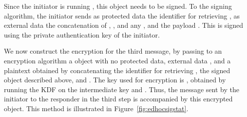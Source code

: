 {Since the initiator is running \mSig, this \mCose{} object needs to be signed. To the signing algorithm, the initiator sends as protected data the identifier for retrieving \mCredi, as external data the concatenation of \mTHthree, \mCredi, and any \mADthree, and the payload \mMacthree. This is signed using the private authentication key of the initiator.  

We now construct the encryption for the third message, by passing to an \mAead{}
encryption algorithm a \mCose{} object with no protected data, external data
\mTHthree, and a plaintext obtained by concatenating the identifier for
retrieving \mCredi, the signed object described above, and \mADthree. The key
used for encryption is \mKthreeae, obtained by running the KDF on the
intermediate key \mPRKthree{} and \mTHtwo. Thus, the message sent by the
initiator to the responder in the third step is \mCr{} accompanied by this encrypted object. This method is illustrated in Figure~\ref{fig:edhocsigstat}.

}
